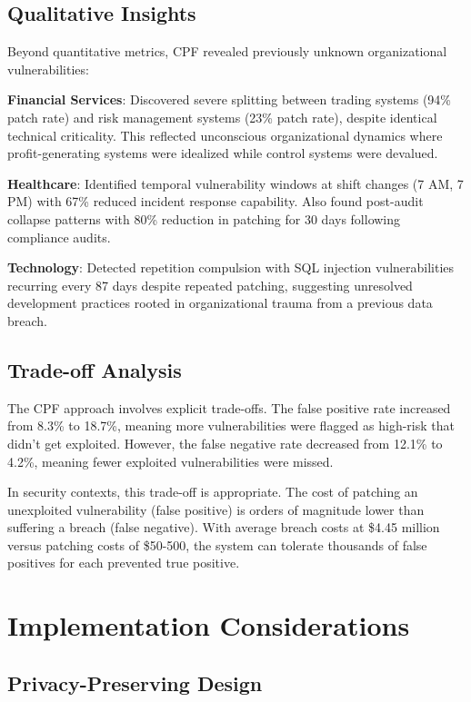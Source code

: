 \documentclass[11pt,a4paper]{article}
\begin{document}
\subsection{Qualitative Insights}

Beyond quantitative metrics, CPF revealed previously unknown organizational vulnerabilities:

\textbf{Financial Services}: Discovered severe splitting between trading systems (94\% patch rate) and risk management systems (23\% patch rate), despite identical technical criticality. This reflected unconscious organizational dynamics where profit-generating systems were idealized while control systems were devalued.

\textbf{Healthcare}: Identified temporal vulnerability windows at shift changes (7 AM, 7 PM) with 67\% reduced incident response capability. Also found post-audit collapse patterns with 80\% reduction in patching for 30 days following compliance audits.

\textbf{Technology}: Detected repetition compulsion with SQL injection vulnerabilities recurring every 87 days despite repeated patching, suggesting unresolved development practices rooted in organizational trauma from a previous data breach.

\subsection{Trade-off Analysis}

The CPF approach involves explicit trade-offs. The false positive rate increased from 8.3\% to 18.7\%, meaning more vulnerabilities were flagged as high-risk that didn't get exploited. However, the false negative rate decreased from 12.1\% to 4.2\%, meaning fewer exploited vulnerabilities were missed.

In security contexts, this trade-off is appropriate. The cost of patching an unexploited vulnerability (false positive) is orders of magnitude lower than suffering a breach (false negative). With average breach costs at \$4.45 million\cite{ibm2023} versus patching costs of \$50-500, the system can tolerate thousands of false positives for each prevented true positive.

\section{Implementation Considerations}

\subsection{Privacy-Preserving Design}
\end{document}
